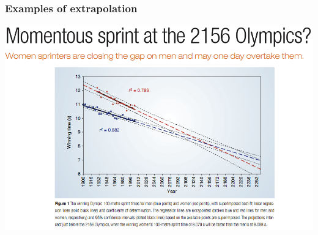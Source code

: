 \documentclass{beamer}
\begin{document}

\begin{frame}
\frametitle{Examples of extrapolation}

\begin{center}
\includegraphics[width=\textwidth]{plots/womenOutsprint}
\end{center}

\end{frame}
\end{document}
